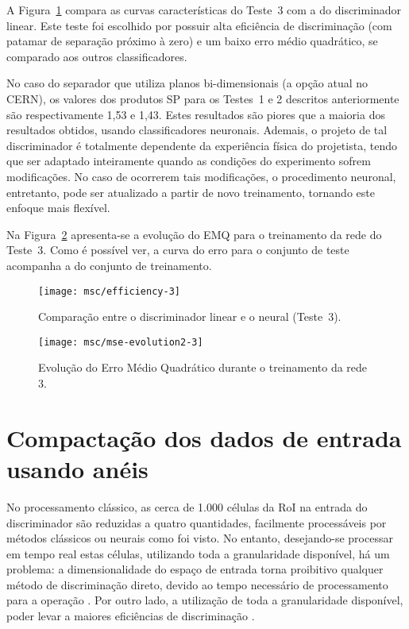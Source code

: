 A Figura~\ref{fig:comp-linear} compara as curvas características do Teste~3
com a do discriminador linear. Este teste foi escolhido por possuir alta
eficiência de discriminação (com patamar de separação próximo à zero) e um
baixo erro médio quadrático, se comparado aos outros classificadores.

No caso do separador que utiliza planos bi-dimensionais (a op\-ção atual no
CERN), os valores dos produtos SP para os Testes~1 e 2 descritos anteriormente
são respectivamente 1,53 e 1,43. Estes resultados são piores que a maioria dos
resultados obtidos, usando classificadores neuronais. Ademais, o projeto de
tal discriminador é totalmente dependente da experiência física do projetista,
tendo que ser adaptado inteiramente quando as condições do experimento sofrem
modificações. No caso de ocorrerem tais modificações, o procedimento neuronal,
entretanto, pode ser atualizado a partir de novo treinamento, tornando este
enfoque mais flexível.

Na Figura~\ref{fig:emq} apresenta-se a evolução do EMQ para o treinamento da
rede do Teste~3. Como é possível ver, a curva do erro para o conjunto de teste
acompanha a do conjunto de treinamento.

\begin{figure}
\begin{center}
\texttt{[image: msc/efficiency-3]}
\end{center}
\caption{Comparação entre o discriminador linear e o neural (Teste~3).}
\label{fig:comp-linear}
\end{figure}

\begin{figure}
\begin{center}
\texttt{[image: msc/mse-evolution2-3]}
\end{center}
\caption{Evolução do Erro Médio Quadrático durante o treinamento da rede 3.}
\label{fig:emq}
\end{figure}

\section{Compactação dos dados de entrada usando a\-néis}
\label{sec:aneis}

No processamento clássico, as cerca de 1.000 células da RoI na entrada do
discriminador são reduzidas a quatro quantidades, facilmente processáveis por
métodos clássicos ou neurais como foi visto. No entanto, desejando-se
processar em tempo real estas células, utilizando toda a granularidade
disponível, há um problema: a dimensionalidade do espaço de entrada torna
proibitivo qualquer método de discriminação direto, devido ao tempo necessário
de processamento para a operação . Por outro lado, a utilização
de toda a granularidade disponível, poder levar a maiores eficiências de
discriminação \cite{seixas:fe, aa:enfpc-00, aa:enfpc-98}.

